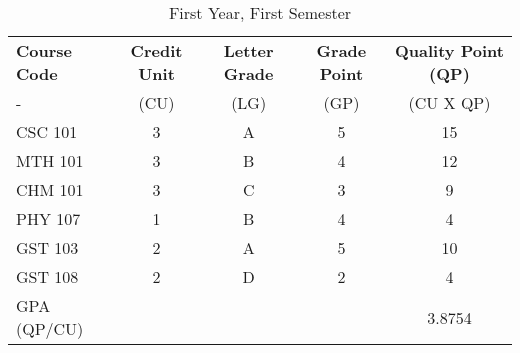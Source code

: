 \documentclass{article}
\begin{document}
	\begin{table}[h!]
		\caption{First Year, First Semester}
		\label{tab:table1}
		\begin{tabular}{l|c|c|c|c|}
			\textbf{Course Code}& \textbf{Credit Unit}& \textbf{Letter Grade} & \textbf{Grade Point} & 	\textbf{Quality Point (QP)}\\
			-& (CU)&(LG)&(GP)&(CU X QP)\\
			\hline
			CSC 101 & 3 & A & 5 & 15\\
			MTH 101 & 3 & B & 4 & 12\\
			CHM 101 & 3 & C & 3 & 9\\
			PHY 107 & 1 & B & 4 & 4\\
			GST 103 & 2 & A & 5 & 10\\
			GST 108 & 2 & D & 2 & 4\\
			\hline
			GPA (QP/CU) &  &  &  & 3.8754     
		\end{tabular}
	\end{table}
\end{document}
